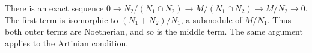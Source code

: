 There is an exact sequence $0\to N_2/(N_1\cap N_2)\to M/(N_1\cap N_2)\to M/N_2\to0$. The first term is isomorphic to $(N_1+N_2)/N_1$, a submodule of $M/N_1$. Thus both outer terms are Noetherian, and so is the middle term. The same argument applies to the Artinian condition.
